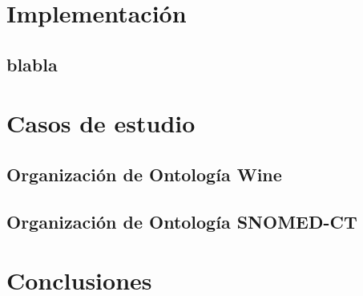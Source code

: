 \section{Implementación}
\subsection{blabla}

\section{Casos de estudio}
\subsection{Organización de Ontología Wine}
\subsection{Organización de Ontología SNOMED-CT}

\section{Conclusiones}